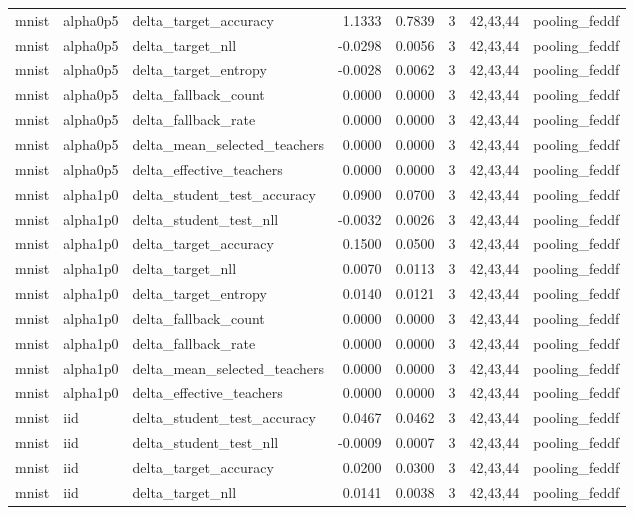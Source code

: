 \begin{tabular}{lllrrrll}
mnist & alpha0p5 & delta\_target\_accuracy & 1.1333 & 0.7839 & 3 & 42,43,44 & pooling\_feddf \\
mnist & alpha0p5 & delta\_target\_nll & -0.0298 & 0.0056 & 3 & 42,43,44 & pooling\_feddf \\
mnist & alpha0p5 & delta\_target\_entropy & -0.0028 & 0.0062 & 3 & 42,43,44 & pooling\_feddf \\
mnist & alpha0p5 & delta\_fallback\_count & 0.0000 & 0.0000 & 3 & 42,43,44 & pooling\_feddf \\
mnist & alpha0p5 & delta\_fallback\_rate & 0.0000 & 0.0000 & 3 & 42,43,44 & pooling\_feddf \\
mnist & alpha0p5 & delta\_mean\_selected\_teachers & 0.0000 & 0.0000 & 3 & 42,43,44 & pooling\_feddf \\
mnist & alpha0p5 & delta\_effective\_teachers & 0.0000 & 0.0000 & 3 & 42,43,44 & pooling\_feddf \\
mnist & alpha1p0 & delta\_student\_test\_accuracy & 0.0900 & 0.0700 & 3 & 42,43,44 & pooling\_feddf \\
mnist & alpha1p0 & delta\_student\_test\_nll & -0.0032 & 0.0026 & 3 & 42,43,44 & pooling\_feddf \\
mnist & alpha1p0 & delta\_target\_accuracy & 0.1500 & 0.0500 & 3 & 42,43,44 & pooling\_feddf \\
mnist & alpha1p0 & delta\_target\_nll & 0.0070 & 0.0113 & 3 & 42,43,44 & pooling\_feddf \\
mnist & alpha1p0 & delta\_target\_entropy & 0.0140 & 0.0121 & 3 & 42,43,44 & pooling\_feddf \\
mnist & alpha1p0 & delta\_fallback\_count & 0.0000 & 0.0000 & 3 & 42,43,44 & pooling\_feddf \\
mnist & alpha1p0 & delta\_fallback\_rate & 0.0000 & 0.0000 & 3 & 42,43,44 & pooling\_feddf \\
mnist & alpha1p0 & delta\_mean\_selected\_teachers & 0.0000 & 0.0000 & 3 & 42,43,44 & pooling\_feddf \\
mnist & alpha1p0 & delta\_effective\_teachers & 0.0000 & 0.0000 & 3 & 42,43,44 & pooling\_feddf \\
mnist & iid & delta\_student\_test\_accuracy & 0.0467 & 0.0462 & 3 & 42,43,44 & pooling\_feddf \\
mnist & iid & delta\_student\_test\_nll & -0.0009 & 0.0007 & 3 & 42,43,44 & pooling\_feddf \\
mnist & iid & delta\_target\_accuracy & 0.0200 & 0.0300 & 3 & 42,43,44 & pooling\_feddf \\
mnist & iid & delta\_target\_nll & 0.0141 & 0.0038 & 3 & 42,43,44 & pooling\_feddf \\

\end{tabular}
